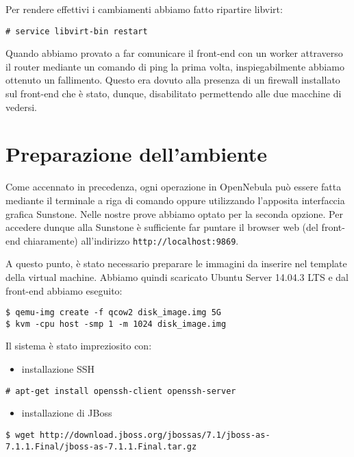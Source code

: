 \documentclass[twoside]{article}
\begin{document}
Per rendere effettivi i cambiamenti abbiamo fatto ripartire libvirt:
\begin{lstlisting}[frame=trBL]
# service libvirt-bin restart
\end{lstlisting}

Quando abbiamo provato a far comunicare il front-end con un worker attraverso il router
mediante un comando di ping la prima volta, inspiegabilmente abbiamo ottenuto un fallimento. Questo
era dovuto alla presenza di un firewall installato sul front-end che è stato, dunque, disabilitato
permettendo alle due macchine di vedersi.

\section{Preparazione dell'ambiente}
Come accennato in precedenza, ogni operazione in OpenNebula può essere fatta mediante
il terminale a riga di comando oppure utilizzando l'apposita interfaccia grafica Sunstone. Nelle nostre
prove abbiamo optato per la seconda opzione. Per accedere dunque alla Sunstone è sufficiente far puntare il
browser web (del front-end chiaramente) all'indirizzo \texttt{http://localhost:9869}.

A questo punto, è stato necessario preparare le immagini da inserire nel template della virtual machine.
Abbiamo quindi scaricato Ubuntu Server 14.04.3 LTS e dal front-end abbiamo eseguito:
\begin{lstlisting}[frame=trBL]
$ qemu-img create -f qcow2 disk_image.img 5G
$ kvm -cpu host -smp 1 -m 1024 disk_image.img
\end{lstlisting}

Il sistema è stato impreziosito con:
\begin{itemize}
	\item installazione SSH
\end{itemize}
\begin{lstlisting}[frame=trBL]
# apt-get install openssh-client openssh-server
\end{lstlisting}
\begin{itemize}
\item installazione di JBoss
\end{itemize}		  
\begin{lstlisting}[frame=trBL]
$ wget http://download.jboss.org/jbossas/7.1/jboss-as-7.1.1.Final/jboss-as-7.1.1.Final.tar.gz		  
\end{lstlisting}

\printbibliography
\end{document}
